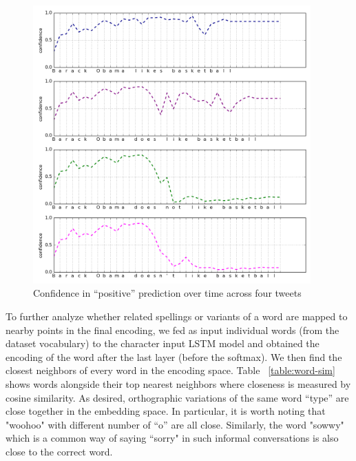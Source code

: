 \documentclass{article} %
\begin{document}
\begin{figure}[h!]
\begin{center}
\includegraphics[width=0.95\textwidth]{figs/basketball}
\end{center}
\caption{Confidence in ``positive'' prediction over time across four tweets}
\label{fig:basketball}
\end{figure}


To further analyze whether related spellings or variants of a word are mapped to nearby points in the final encoding, we fed as input individual words (from the dataset vocabulary) to the character input LSTM model and obtained the encoding of the word after the last layer (before the softmax).
We then find the closest neighbors of every word in the encoding space.
Table ~\ref{table:word-sim} shows words alongside their top nearest neighbors where closeness is measured by cosine similarity. As desired, orthographic variations of the same word ``type'' are close together in the embedding space. In particular, it is worth noting that "woohoo" with different number of ``o'' are all close. Similarly, the word "sowwy" which is a common way of saying ``sorry" in such informal conversations is also close to the correct word.
\end{document}
